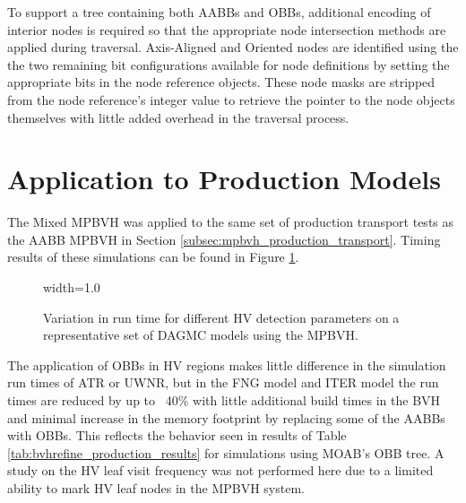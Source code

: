 To support a tree containing both AABBs and OBBs, additional encoding of
interior nodes is required so that the appropriate node intersection methods are
applied during traversal. Axis-Aligned and Oriented nodes are identified using
the the two remaining bit configurations available for node definitions by
setting the appropriate bits in the node reference objects. These node masks are
stripped from the node reference's integer value to retrieve the pointer to the
node objects themselves with little added overhead in the traversal process.

\section{Application to Production Models}

The Mixed MPBVH was applied to the same set of production transport tests as the
AABB MPBVH in Section \ref{subsec:mpbvh_production_transport}. Timing results of
these simulations can be found in Figure \ref{fig:hv_parameter_study_mpbvh}.

\begin{figure}[H]
  \centering
  {width=1.0\textwidth}
  \caption[High valence detection parameter study.]{Variation in run time for
    different HV detection parameters on a representative set of DAGMC models
    using the MPBVH.}
  \label{fig:hv_parameter_study_mpbvh}
\end{figure}

The application of OBBs in HV regions makes little difference in the simulation
run times of ATR or UWNR, but in the FNG model and ITER model the run times are
reduced by up to ~40\% with little additional build times in the BVH and
minimal increase in the memory footprint by replacing some of the AABBs with
OBBs. This reflects the behavior seen in results of Table
\ref{tab:bvhrefine_production_results} for simulations using MOAB's OBB tree. A
study on the HV leaf visit frequency was not performed here due to a limited
ability to mark HV leaf nodes in the MPBVH system.

